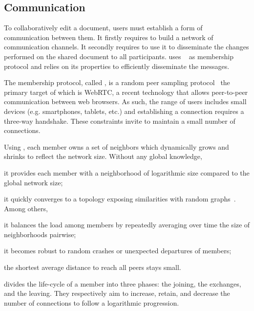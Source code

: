 \subsection{Communication}
To collaboratively edit a document, users must establish a form of communication
between them. It firstly requires to build a network of communication
channels. It secondly requires to use it to disseminate the changes performed on
the shared document to all participants.  \CRATE uses
\SPRAY~\cite{nedelec2015spray} as membership protocol and relies on its
properties to efficiently disseminate the messages.

\begin{asparadesc}
\item [The membership protocol,] called \SPRAY, is a random peer sampling
  protocol~\cite{jelasity2007gossip} the primary target of which is WebRTC, a
  recent technology that allows peer-to-peer communication between web browsers.
  As such, the range of users includes small devices (e.g. smartphones, tablets,
  etc.) and establishing a connection requires a three-way handshake. These
  constraints invite to maintain a small number of connections.

  Using \SPRAY, each member owns a set of neighbors which dynamically grows and
  shrinks to reflect the network size. Without any global knowledge,
  \begin{inparaenum}[(i)]
  \item it provides each member with a neighborhood of logarithmic size compared
    to the global network size;
  \item it quickly converges to a topology exposing similarities with random
    graphs~\cite{erdos1959random}. Among others,
    \begin{inparaenum}[(a)]
    \item it balances the load among members by repeatedly averaging over time the
      size of neighborhoods pairwise;
    \item it becomes robust to random crashes or unexpected departures of
      members;
    \item the shortest average distance to reach all peers stays small.
    \end{inparaenum}
  \end{inparaenum}
  
  \SPRAY divides the life-cycle of a member into three phases: the joining, the
  exchanges, and the leaving. They respectively aim to increase, retain, and
  decrease the number of connections to follow a logarithmic progression.


\end{asparadesc}
